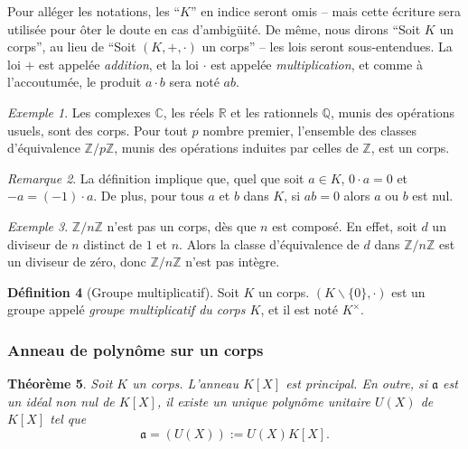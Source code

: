 \documentclass[a4paper, titlepage]{article}
\newtheorem{theo}{Théorème}[section]
\theoremstyle{definition}
\newtheorem{defi}[theo]{Définition}
\theoremstyle{remark}
\newtheorem{rema}[theo]{Remarque}
\newtheorem{exem}[theo]{Exemple}
\def\Z{\mathbb Z}
\def\Q{\mathbb Q}
\def\R{\mathbb R}
\def\C{\mathbb C}
\begin{document}
Pour alléger les notations, les ``$K$'' en indice seront omis -- mais cette écriture sera utilisée pour ôter le doute en cas d’ambigüité. De même, nous dirons ``Soit $K$ un corps'', au lieu de ``Soit $(K,+,\cdot)$ un corps'' -- les lois seront sous-entendues. La loi $+$ est appelée \textit{addition}, et la loi $\cdot$ est appelée \textit{multiplication}, et comme à l'accoutumée, le produit $a\cdot b$ sera noté $ab$.

\begin{exem}
Les complexes $\C$, les réels $\R$ et les rationnels $\Q$, munis des opérations usuels, sont des corps. Pour tout $p$ nombre premier, l'ensemble des classes d'équivalence $\Z/p\Z$, munis des opérations induites par celles de $\Z$, est un corps.
\end{exem}

\begin{rema}
La définition implique que, quel que soit $a \in K$, $0\cdot a = 0$ et $-a = (-1)\cdot a$. De plus, pour tous $a$ et $b$ dans $K$, si $ab = 0$ alors $a$ ou $b$ est nul.
\end{rema}

\begin{exem}
$\Z/n\Z$ n'est pas un corps, dès que $n$ est composé. En effet, soit $d$ un diviseur de $n$ distinct de $1$ et $n$. Alors la classe d'équivalence de $d$ dans $\Z/n\Z$ est un diviseur de zéro, donc $\Z/n\Z$ n'est pas intègre.
\end{exem}

\begin{defi}[Groupe multiplicatif]
Soit $K$ un corps. $(K\backslash\{0\},\cdot)$ est un groupe appelé \textit{groupe multiplicatif du corps $K$}, et il est noté $K^\times$.
\end{defi}

\subsubsection*{Anneau de polynôme sur un corps}

\begin{theo}\label{theoAnnPolyPrincipal}
Soit $K$ un corps. L'anneau $K[X]$ est principal. En outre, si $\mathfrak{a}$ est un idéal non nul de $K[X]$, il existe un unique polynôme unitaire $U(X)$ de $K[X]$ tel que $$\mathfrak{a} = (U(X)) := U(X)K[X].$$
\end{theo}
\end{document}
